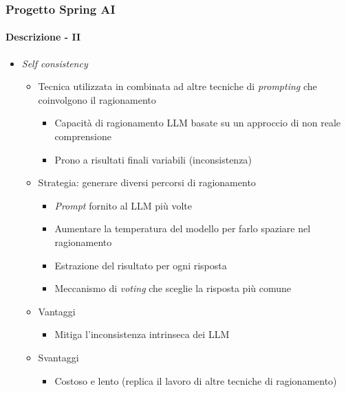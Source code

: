 %
\begin{frame}[t,fragile] \frametitle{Progetto Spring AI}
    \framesubtitle{Descrizione - II}
    {\small
        \begin{itemize}[leftmargin=10pt,align=right]
            \item[\alertedcircled{2}] \textit{Self consistency}
            \begin{itemize}[leftmargin=10pt,align=right]
                \item[\alert{\faArrowCircleRight}] Tecnica utilizzata in combinata ad altre tecniche di \textit{prompting} che coinvolgono il \alert{ragionamento}
                \begin{itemize}[leftmargin=10pt,align=right]
                    \item[\alert{\faArrowCircleRight}] Capacità di ragionamento LLM basate su un approccio di \alert{non reale comprensione}
                    \item[\alert{\faArrowCircleRight}] Prono a risultati finali variabili (\alert{inconsistenza})
                \end{itemize}
                \item[\alert{\faArrowCircleRight}] Strategia: generare diversi \alert{percorsi di ragionamento}
                \begin{itemize}[leftmargin=10pt,align=right]
                    \item[\alert{\faArrowCircleRight}] \textit{Prompt} fornito al LLM più volte
                    \item[\alert{\faExclamationTriangle}] Aumentare la temperatura del modello per farlo spaziare nel ragionamento 
                    \item[\alert{\faArrowCircleRight}] Estrazione del risultato per ogni risposta
                    \item[\alert{}] Meccanismo di \textit{voting} che sceglie la risposta più comune 
                \end{itemize}
                \item[\alert{\faArrowCircleRight}] Vantaggi
                \begin{itemize}[leftmargin=10pt,align=right]
                    \item[\alert{\faArrowCircleRight}] Mitiga l'inconsistenza intrinseca dei LLM
                \end{itemize}
                \item[\alert{\faArrowCircleRight}] Svantaggi
                \begin{itemize}[leftmargin=10pt,align=right]
                    \item[\alert{\faArrowCircleRight}] Costoso e lento (replica il lavoro di altre tecniche di ragionamento)
                \end{itemize}               
            \end{itemize}
        \end{itemize}
    }
\end{frame}

